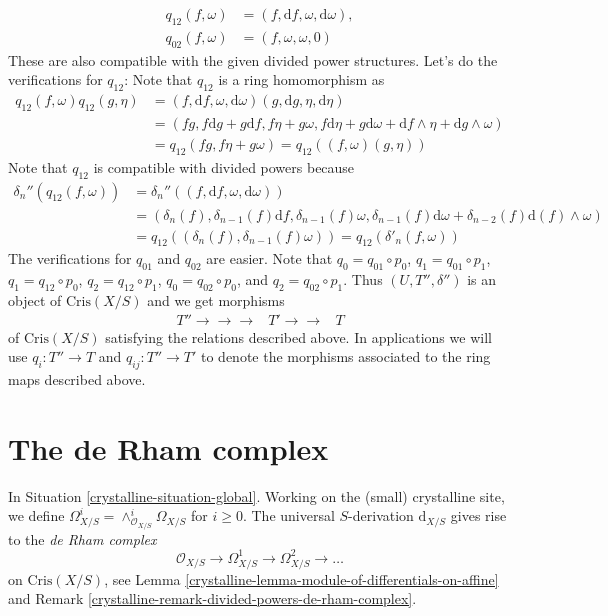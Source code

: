 \begin{remark}
\begin{align*}
q_{12}(f, \omega) & =
(f, \text{d}f, \omega, \text{d}\omega), \\
q_{02}(f, \omega) & = (f, \omega, \omega, 0)
\end{align*}
These are also compatible with the given divided power
structures. Let's do the verifications for $q_{12}$: Note
that $q_{12}$ is a ring homomorphism as
\begin{align*}
q_{12}(f, \omega)q_{12}(g, \eta) & =
(f, \text{d}f, \omega, \text{d}\omega)(g, \text{d}g, \eta, \text{d}\eta) \\
& =
(fg, f\text{d}g + g \text{d}f, f\eta + g\omega,
f\text{d}\eta + g\text{d}\omega + \text{d}f \wedge \eta +
\text{d}g \wedge \omega) \\
& = q_{12}(fg, f\eta + g\omega) = q_{12}((f, \omega)(g, \eta))
\end{align*}
Note that $q_{12}$ is compatible with divided powers because
\begin{align*}
\delta_n''(q_{12}(f, \omega)) & =
\delta_n''((f, \text{d}f, \omega, \text{d}\omega)) \\
& =
(\delta_n(f), \delta_{n - 1}(f)\text{d}f, \delta_{n - 1}(f)\omega,
\delta_{n - 1}(f)\text{d}\omega + \delta_{n - 2}(f)\text{d}(f) \wedge \omega)
\\
& = q_{12}((\delta_n(f), \delta_{n - 1}(f)\omega)) =
q_{12}(\delta'_n(f, \omega))
\end{align*}
The verifications for $q_{01}$ and $q_{02}$ are easier.
Note that $q_0 = q_{01} \circ p_0$, $q_1 = q_{01} \circ p_1$,
$q_1 = q_{12} \circ p_0$, $q_2 = q_{12} \circ p_1$,
$q_0 = q_{02} \circ p_0$, and $q_2 = q_{02} \circ p_1$.
Thus $(U, T'', \delta'')$ is an object of $\text{Cris}(X/S)$
and we get morphisms
$$
\begin{array}{ccc}T''
\longrightarrow\longrightarrow\longrightarrow & T'
\longrightarrow\longrightarrow & T\end{array}
$$
of $\text{Cris}(X/S)$ satisfying the relations described above.
In applications we will use $q_i : T'' \to T$ and
$q_{ij} : T'' \to T'$ to denote the morphisms associated to the
ring maps described above.
\end{remark}

\section{The de Rham complex}
\label{crystalline-section-de-Rham}
In Situation \ref{crystalline-situation-global}.
Working on the (small) crystalline site, we define
$\Omega^i_{X/S} = \wedge^i_{\mathcal{O}_{X/S}} \Omega_{X/S}$
for $i \geq 0$. The universal $S$-derivation $\text{d}_{X/S}$ gives
rise to the {\it de Rham complex}
$$
\mathcal{O}_{X/S} \to \Omega^1_{X/S} \to \Omega^2_{X/S} \to \ldots
$$
on $\text{Cris}(X/S)$, see
Lemma \ref{crystalline-lemma-module-of-differentials-on-affine} and
Remark \ref{crystalline-remark-divided-powers-de-rham-complex}.

